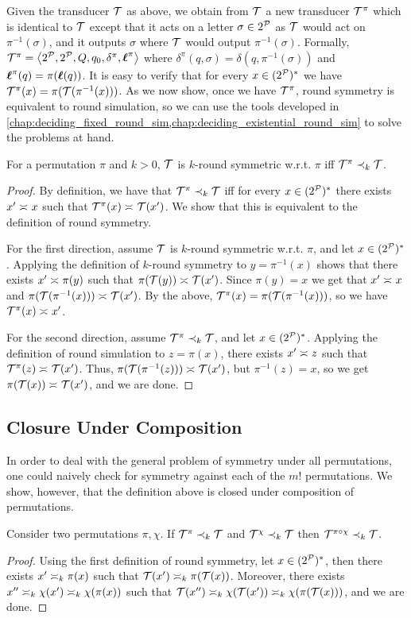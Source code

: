 Given the transducer $\cT$ as above, we obtain from $\cT$ a new transducer $\cT^\pi$ which is identical to $\cT$ except that it acts on a letter $\sigma\in 2^\cP$ as $\cT$ would act on $\pi^{-1}(\sigma)$, and it outputs $\sigma$ where $\cT$ would output $\pi^{-1}(\sigma)$. Formally, $\cT^{\pi}=\tup{2^\cP,2^\cP,Q,q_0,\delta^{\pi},\lab^{\pi}}$ where $\delta^{\pi}(q,\sigma)=\delta(q,\pi^{-1}(\sigma))$ and $\lab^{\pi}(q)=\pi(\lab(q))$. It is easy to verify that for every $x\in (2^{\cP})^*$ we have $\cT^\pi(x) = \pi(\cT(\pi^{-1}(x)))$.
As we now show, once we have $\cT^\pi$, round symmetry is equivalent to round simulation, so we can use the tools developed in~ \cref{chap:deciding_fixed_round_sim,chap:deciding_existential_round_sim} to solve the problems at hand.
\begin{lemma}
    \label{lem:symmetry_to_simulation}
    For a permutation $\pi$ and $k>0$, $\cT$ is $k$-round symmetric w.r.t.\! $\pi$ iff $\cT^{\pi}\prec_k \cT$.
\end{lemma}
\begin{proof}
    By definition, we have that $\cT^{\pi}\prec_{k} \cT$ iff for every $x\in (2^{\cP})^*$ there exists $x'\req x$ such that $\cT^{\pi}(x)\req \cT(x')$. We show that this is equivalent to the definition of round symmetry.
    
    For the first direction, assume $\cT$ is $k$-round symmetric w.r.t.\! $\pi$, and let $x\in (2^{\cP})^*$. Applying the definition of $k$-round symmetry to $y=\pi^{-1}(x)$ shows that there exists $x'\req \pi(y)$ such that $\pi(\cT(y))\req \cT(x')$. Since $\pi(y)=x$ we get that $x'\req x$ and $\pi(\cT(\pi^{-1}(x)))\req \cT(x')$. By the above, $\cT^\pi(x) = \pi(\cT(\pi^{-1}(x)))$, so we have $\cT^{\pi}(x)\req x'$.
    
    For the second direction, assume $\cT^\pi \prec_k \cT$, and let $x\in (2^{\cP})^*$. Applying the definition of round simulation to $z=\pi(x)$, there exists $x'\req z$ such that $\cT^{\pi}(z)\req \cT(x')$. Thus, $\pi(\cT(\pi^{-1}(z)))\req \cT(x')$, but $\pi^{-1}(z)=x$, so we get $\pi(\cT(x))\req \cT(x')$, and we are done.
\end{proof}

\subsection*{Closure Under Composition}
In order to deal with the general problem of symmetry under all permutations, one could naively check for symmetry against each of the $m!$ permutations. We show, however, that the definition above is closed under composition of permutations. 
\begin{lemma}
    \label{lem:closure_composition}
    Consider two permutations $\pi,\chi$. If $\cT^\pi\prec_k \cT$ and $\cT^\chi \prec_k \cT$ then $\cT^{\pi\circ \chi} \prec_k \cT$.
\end{lemma}
\begin{proof}
    Using the first definition of round symmetry, let $x\in (2^{\cP})^*$, then there exists $x'\req[k] \pi(x)$ such that $\cT(x')\req[k] \pi(\cT(x))$. Moreover, there exists $x''\req[k] \chi(x') \req[k] \chi(\pi(x))$ such that $\cT(x'')\req[k] \chi(\cT(x'))\req[k] \chi(\pi(\cT(x)))$, and we are done.
\end{proof}

